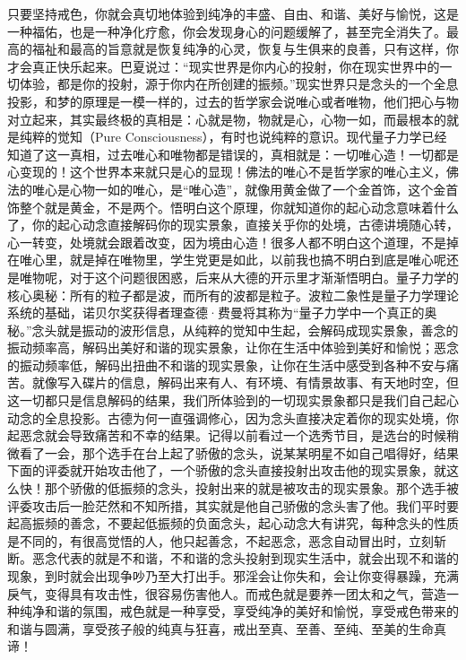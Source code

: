 只要坚持戒色，你就会真切地体验到纯净的丰盛、自由、和谐、美好与愉悦，这是一种福佑，也是一种净化疗愈，你会发现身心的问题缓解了，甚至完全消失了。最高的福祉和最高的旨意就是恢复纯净的心灵，恢复与生俱来的良善，只有这样，你才会真正快乐起来。巴夏说过：“现实世界是你内心的投射，你在现实世界中的一切体验，都是你的投射，源于你内在所创建的振频。”现实世界只是念头的一个全息投影，和梦的原理是一模一样的，过去的哲学家会说唯心或者唯物，他们把心与物对立起来，其实最终极的真相是：心就是物，物就是心，心物一如，而最根本的就是纯粹的觉知（Pure Consciousness），有时也说纯粹的意识。现代量子力学已经知道了这一真相，过去唯心和唯物都是错误的，真相就是：一切唯心造！一切都是心变现的！这个世界本来就只是心的显现！佛法的唯心不是哲学家的唯心主义，佛法的唯心是心物一如的唯心，是“唯心造”，就像用黄金做了一个金首饰，这个金首饰整个就是黄金，不是两个。悟明白这个原理，你就知道你的起心动念意味着什么了，你的起心动念直接解码你的现实景象，直接关乎你的处境，古德讲境随心转，心一转变，处境就会跟着改变，因为境由心造！很多人都不明白这个道理，不是掉在唯心里，就是掉在唯物里，学生党更是如此，以前我也搞不明白到底是唯心呢还是唯物呢，对于这个问题很困惑，后来从大德的开示里才渐渐悟明白。量子力学的核心奥秘：所有的粒子都是波，而所有的波都是粒子。波粒二象性是量子力学理论系统的基础，诺贝尔奖获得者理查德·费曼将其称为“量子力学中一个真正的奥秘。”念头就是振动的波形信息，从纯粹的觉知中生起，会解码成现实景象，善念的振动频率高，解码出美好和谐的现实景象，让你在生活中体验到美好和愉悦；恶念的振动频率低，解码出扭曲不和谐的现实景象，让你在生活中感受到各种不安与痛苦。就像写入碟片的信息，解码出来有人、有环境、有情景故事、有天地时空，但这一切都只是信息解码的结果，我们所体验到的一切现实景象都只是我们自己起心动念的全息投影。古德为何一直强调修心，因为念头直接决定着你的现实处境，你起恶念就会导致痛苦和不幸的结果。记得以前看过一个选秀节目，是选台的时候稍微看了一会，那个选手在台上起了骄傲的念头，说某某明星不如自己唱得好，结果下面的评委就开始攻击他了，一个骄傲的念头直接投射出攻击他的现实景象，就这么快！那个骄傲的低振频的念头，投射出来的就是被攻击的现实景象。那个选手被评委攻击后一脸茫然和不知所措，其实就是他自己骄傲的念头害了他。我们平时要起高振频的善念，不要起低振频的负面念头，起心动念大有讲究，每种念头的性质是不同的，有很高觉悟的人，他只起善念，不起恶念，恶念自动冒出时，立刻斩断。恶念代表的就是不和谐，不和谐的念头投射到现实生活中，就会出现不和谐的现象，到时就会出现争吵乃至大打出手。邪淫会让你失和，会让你变得暴躁，充满戾气，变得具有攻击性，很容易伤害他人。而戒色就是要养一团太和之气，营造一种纯净和谐的氛围，戒色就是一种享受，享受纯净的美好和愉悦，享受戒色带来的和谐与圆满，享受孩子般的纯真与狂喜，戒出至真、至善、至纯、至美的生命真谛！

